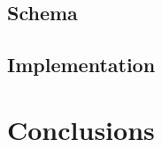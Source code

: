 \documentclass{article}
\begin{document}
\subsection{Schema}

\subsection{Implementation}

\section{Conclusions}




% 
% 




\end{document}
